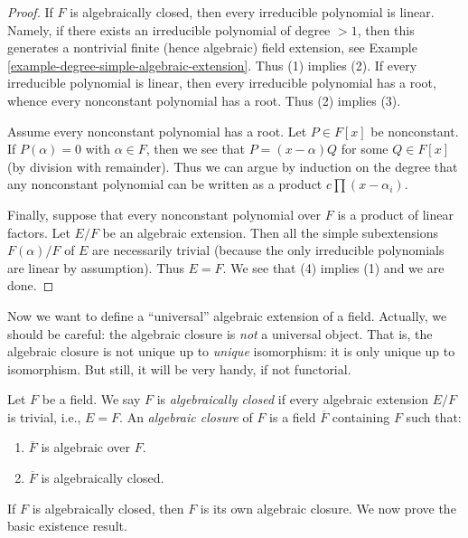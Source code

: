 \begin{proof}
If $F$ is algebraically closed, then every irreducible polynomial is linear.
Namely, if there exists an irreducible polynomial of degree $> 1$, then
this generates a nontrivial finite (hence algebraic) field extension, see
Example \ref{example-degree-simple-algebraic-extension}.
Thus (1) implies (2). If every irreducible polynomial
is linear, then every irreducible polynomial has a root, whence every
nonconstant polynomial has a root. Thus (2) implies (3).

\medskip\noindent
Assume every nonconstant polynomial has a root. Let $P \in F[x]$
be nonconstant. If $P(\alpha) = 0$ with $\alpha \in F$, then we see
that $P = (x - \alpha)Q$ for some $Q \in F[x]$ (by division with remainder).
Thus we can argue by induction on the degree that any nonconstant
polynomial can be written as a product $c \prod (x - \alpha_i)$.

\medskip\noindent
Finally, suppose that every nonconstant polynomial over $F$ is a product of
linear factors. Let $E/F$ be an algebraic extension. Then all the simple
subextensions $F(\alpha)/F$ of $E$ are necessarily trivial (because the
only irreducible polynomials are linear by assumption). Thus $E = F$.
We see that (4) implies (1) and we are done.
\end{proof}

\noindent
Now we want to define a ``universal'' algebraic extension of a field.
Actually, we should be careful: the algebraic closure is {\it not} a
universal object. That is, the algebraic closure is not unique up to
{\it unique} isomorphism: it is only unique up to isomorphism. But still,
it will be very handy, if not functorial.

\begin{definition}
\label{definition-algebraic-closure}
Let $F$ be a field. We say $F$ is {\it algebraically closed} if every
algebraic extension $E/F$ is trivial, i.e., $E = F$. An {\it algebraic closure}
of $F$ is a field $\overline{F}$ containing $F$ such that:
\begin{enumerate}
\item $\overline{F}$ is algebraic over $F$.
\item $\overline{F}$ is algebraically closed.
\end{enumerate}
\end{definition}

\noindent
If $F$ is algebraically closed, then $F$ is its own algebraic closure.
We now prove the basic existence result.

